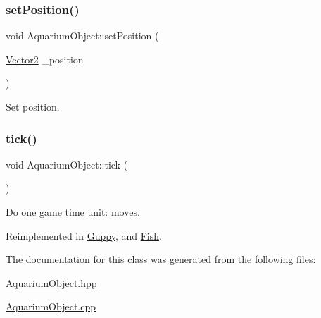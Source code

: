 \mbox{\label{class_aquarium_object_a2ec88f59595aec6ad788b90e9896b9b9}} 
\subsubsection{\texorpdfstring{set\+Position()}{setPosition()}}
{\footnotesize\ttfamily void Aquarium\+Object\+::set\+Position (\begin{DoxyParamCaption}\item[{\mbox{\hyperlink{struct_vector2}{Vector2}}}]{\+\_\+position }\end{DoxyParamCaption})}



Set position. 

\mbox{\label{class_aquarium_object_a3a8269dfe29631656916cce254e77059}} 
\subsubsection{\texorpdfstring{tick()}{tick()}}
{\footnotesize\ttfamily void Aquarium\+Object\+::tick (\begin{DoxyParamCaption}{ }\end{DoxyParamCaption})\hspace{0.3cm}{\ttfamily [virtual]}}



Do one game time unit\+: moves. 



Reimplemented in \mbox{\hyperlink{class_guppy_ab2f219fa29b0d22ee9702a55fede519b}{Guppy}}, and \mbox{\hyperlink{class_fish_aa49a70677a400c471b1e3db5d8f1881e}{Fish}}.



The documentation for this class was generated from the following files\+:\begin{DoxyCompactItemize}
\item 
\mbox{\hyperlink{_aquarium_object_8hpp}{Aquarium\+Object.\+hpp}}\item 
\mbox{\hyperlink{_aquarium_object_8cpp}{Aquarium\+Object.\+cpp}}\end{DoxyCompactItemize}
